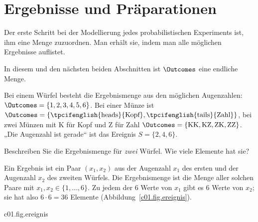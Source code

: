 \section{Ergebnisse und Präparationen}\label{c01.s1}

Der erste Schritt bei der Modellierung jedes probabilistischen Experiments ist, ihm eine
Menge zuzuordnen. Man erhält sie, indem man alle möglichen Ergebnisse auflistet.


In diesem und den nächsten beiden Abschnitten ist $\Outcomes$ eine endliche Menge.

\begin{example}\label{c01.ex.wuerfel}
  Bei einem Würfel besteht die Ergebnismenge aus den möglichen Augenzahlen:
  $\Outcomes = \{1, 2, 3, 4, 5, 6\}$. Bei einer Münze ist
  $\Outcomes = \{\text{\tpcifenglish{heads}{Kopf}}, \text{\tpcifenglish{tails}{Zahl}}\}$,
  bei zwei Münzen mit K für Kopf und Z für Zahl
  $\Outcomes = \{\text{KK}, \text{KZ}, \text{ZK}, \text{ZZ}\}$. „Die Augenzahl ist gerade“
  ist das Ereignis $S = \{2, 4, 6\}$.
\end{example}

\begin{exercise}\label{c01.exc.zwei-wuerfel}
  Beschreiben Sie die Ergebnismenge für \emph{zwei} Würfel. Wie viele Elemente hat sie?
\end{exercise}
\begin{solution}
  Ein Ergebnis ist ein Paar $(x_1, x_2)$ aus der Augenzahl $x_1$ des ersten und der
  Augenzahl $x_2$ des zweiten Würfels. Die Ergebnismenge ist die Menge aller solchen Paare
  mit $x_1, x_2 \in \{1, \dots, 6\}$. Zu jedem der $6$ Werte von $x_1$ gibt es $6$ Werte
  von $x_2$; sie hat also $6 \cdot 6 = 36$ Elemente
  (Abbildung~\ref{c01.fig.ereignis}).
\end{solution}

\begin{tpcfigure}{c01.fig.ereignis}

  \caption{Ergebnismengen und Ereignisse. (a) Ein Würfel: sechs Ergebnisse; das Ereignis
    „gerade Augenzahl“ ist die Menge der schraffierten Felder. (b) Zwei Würfel: Jeder
    Punkt ist ein Paar $(x_1, x_2)$, zusammen $36$ Ergebnisse. Das Ereignis „die
    Augensumme ist $7$“ besteht aus den sechs mit Quadraten markierten Paaren.}
\end{tpcfigure}

